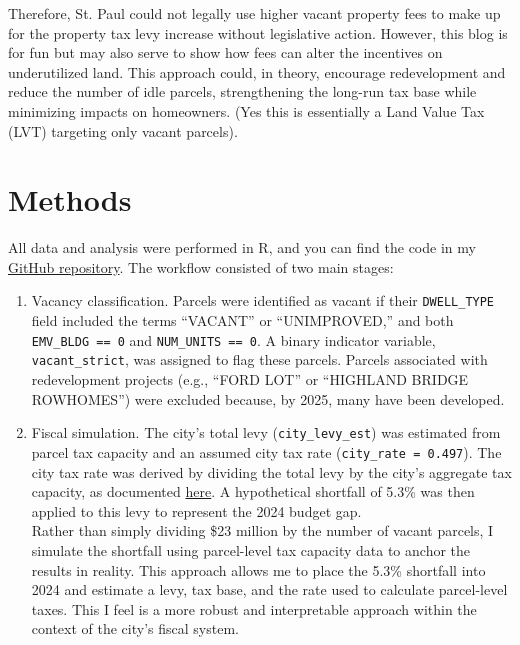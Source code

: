 \documentclass[12pt]{article}
\begin{document}
Therefore, St. Paul could not legally use higher vacant property fees to make up for the property tax levy increase without legislative action. However, this blog is for fun but may also serve to show how fees can alter the incentives on underutilized land. This approach could, in theory, encourage redevelopment and reduce the number of idle parcels, strengthening the long-run tax base while minimizing impacts on homeowners. (Yes this is essentially a Land Value Tax (LVT) targeting only vacant parcels).


\section*{Methods}

All data and analysis were performed in R, and you can find the code in my \href{https://github.com/MatthewHockert/vacant_land_fees_st_paul_blog}{GitHub repository}. The workflow consisted of two main stages:

\begin{enumerate}

    \item Vacancy classification. Parcels were identified as vacant if their \texttt{DWELL\_TYPE} field included the terms ``VACANT'' or ``UNIMPROVED,'' and both \texttt{EMV\_BLDG == 0} and \texttt{NUM\_UNITS == 0}. A binary indicator variable, \texttt{vacant\_strict}, was assigned to flag these parcels. Parcels associated with redevelopment projects (e.g., ``FORD LOT'' or ``HIGHLAND BRIDGE ROWHOMES'') were excluded because, by 2025, many have been developed.

    \item Fiscal simulation. The city’s total levy (\texttt{city\_levy\_est}) was estimated from parcel tax capacity and an assumed city tax rate (\texttt{city\_rate = 0.497}). The city tax rate was derived by dividing the total levy by the city’s aggregate tax capacity, as documented \href{https://www.stpaul.gov/sites/default/files/2024-08/Major%20City%20General%20Fund%20Revenues%202025%20Proposed.pdf}{here}. A hypothetical shortfall of 5.3\% was then applied to this levy to represent the 2024 budget gap. \\

    Rather than simply dividing \$23 million by the number of vacant parcels, I simulate the shortfall using parcel-level tax capacity data to anchor the results in reality. This approach allows me to place the 5.3\% shortfall into 2024 and estimate a levy, tax base, and the rate used to calculate parcel-level taxes. This I feel is a more robust and interpretable approach within the context of the city’s fiscal system.
\end{enumerate}
\end{document}
